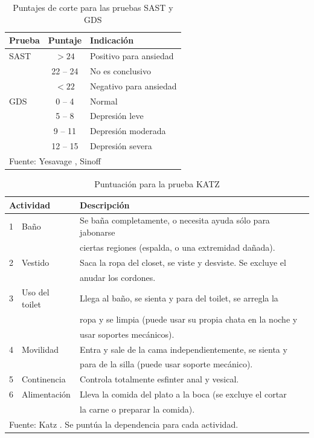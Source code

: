 \documentclass[12pt,letterpaper]{book}
\begin{document}
\begin{table}
\centering
\caption{Puntajes de corte para las pruebas SAST y GDS}
\begin{tabular}{lcl}
\toprule
Prueba & Puntaje & Indicación \\
\midrule
SAST
& $>24$ & Positivo para ansiedad \\
& 22 -- 24 & No es conclusivo \\
& $<22$ & Negativo para ansiedad \\
\midrule
GDS
& 0 -- 4 & Normal \\
& 5 -- 8 & Depresión leve \\
& 9 -- 11 & Depresión moderada \\
& 12 -- 15 & Depresión severa \\
\bottomrule
\multicolumn{3}{l}{Fuente: Yesavage \cite{Yesavage82}, Sinoff \cite{sinoff99} }
\end{tabular}
\label{anexo:sast_gds}
\end{table}

\begin{table}
\centering
\caption{Puntuación para la prueba KATZ}
\begin{tabular}{lll}
\toprule
\multicolumn{2}{l}{Actividad} & Descripción \\
\midrule
1 & Baño           & Se baña completamente, o necesita ayuda sólo para jabonarse\\
                  && ciertas regiones (espalda, o una extremidad dañada). \\
2 & Vestido & Saca la ropa del closet, se viste y desviste. Se excluye el\\
                  && anudar los cordones. \\
3 & Uso del toilet & Llega al baño, se sienta y para del toilet, se arregla la\\
                  && ropa y se limpia (puede usar su propia chata en la noche y\\
                  && usar soportes mecánicos).\\
4 & Movilidad      & Entra y sale de la cama independientemente, se sienta y\\
                  && para de la silla (puede usar soporte mecánico). \\
5 & Continencia    & Controla totalmente esfinter anal y vesical.\\
6 & Alimentación   & Lleva la comida del plato a la boca (se excluye el cortar\\
                  && la carne o preparar la comida). \\
\bottomrule
\multicolumn{3}{l}{Fuente: Katz \cite{katz70}. Se puntúa la dependencia para cada actividad.}
\end{tabular}
\label{anexo:katz}
\end{table}
\end{document}
